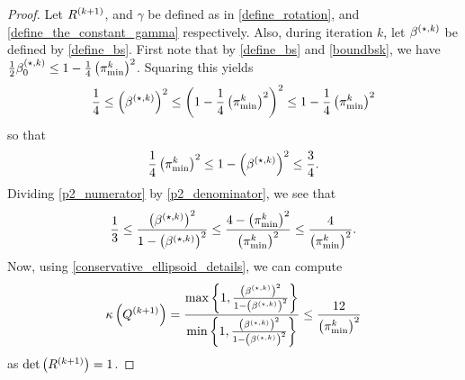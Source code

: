 \begin{proof}
Let ${R^{(k+1)}}$, and $\gamma$ be defined as in \cref{define_rotation}, and \cref{define_the_constant_gamma} respectively.
Also, during iteration $k$, let ${\beta^{(\star, k)}}$ be defined by \cref{define_bs}.
First note that by \cref{define_bs} and \cref{boundbsk}, we have
$\frac 1 2 {\beta_0^{(\star, k)}} \le 1 - \frac 1 4 \left({\pi^k_{\textrm{min}}}\right)^2$.
Squaring this yields
\begin{align}
\frac {1} 4 \le \left({\beta^{(\star, k)}}\right)^2 \le \left(1 - \frac 1 4 \left({\pi^k_{\textrm{min}}}\right)^2\right)^2 \le 1 - \frac 1 4 \left({\pi^k_{\textrm{min}}}\right)^2 \label{p2_numerator}
\end{align}
so that
\begin{align}
\frac 1 4  \left({\pi^k_{\textrm{min}}}\right)^2 \le 1 - \left({\beta^{(\star, k)}}\right)^2 \le \frac 3 4. \label{p2_denominator}
\end{align}
Dividing \cref{p2_numerator} by \cref{p2_denominator}, we see that
\begin{align*}
\frac 1 3
\le \frac{\left({\beta^{(\star, k)}}\right)^2}{1 - \left({\beta^{(\star, k)}}\right)^2}
\le \frac {4 - \left({\pi^k_{\textrm{min}}}\right)^2}{\left({\pi^k_{\textrm{min}}}\right)^2} \le \frac {4}{\left({\pi^k_{\textrm{min}}}\right)^2}.
\end{align*}
Now, using \cref{conservative_ellipsoid_details}, we can compute 
\begin{align*}
{\kappa} \left({Q^{(k+1)}}\right) 
= \frac{\max\left\{1, \frac{\left({\beta^{(\star, k)}}\right)^2}{1 - \left({\beta^{(\star, k)}}\right)^2}\right\}}{\min\left\{1, \frac{\left({\beta^{(\star, k)}}\right)^2}{1 - \left({\beta^{(\star, k)}}\right)^2}\right\}} 
\le \frac {12}{\left({\pi^k_{\textrm{min}}}\right)^2}
\end{align*}
as $\det\left({R^{(k+1)}}\right) = 1$.
\end{proof}




\begin{lemma}
\label[lemma]{cone_subset_cone}
Given $u, v \in \Rn$, and $\gamma \in (0, 1]$, $\beta \in [0, \gamma)$ that satisfy $\|u\| = \|v\|= 1$, $u^Tv = \gamma$, define
\begin{align*}
B = \{x\in\Rn | {v}^Tx \ge \beta\|x\|\}, \quad
S = \left\{x\in\Rn \bigg| u^Tx \ge \left(\beta\gamma + \sqrt{(1 - \beta^2)\left(1 - \gamma^2\right)}\right)\|x\| \right\}. 
\end{align*}
Then, $S \subseteq B$.
\end{lemma}

